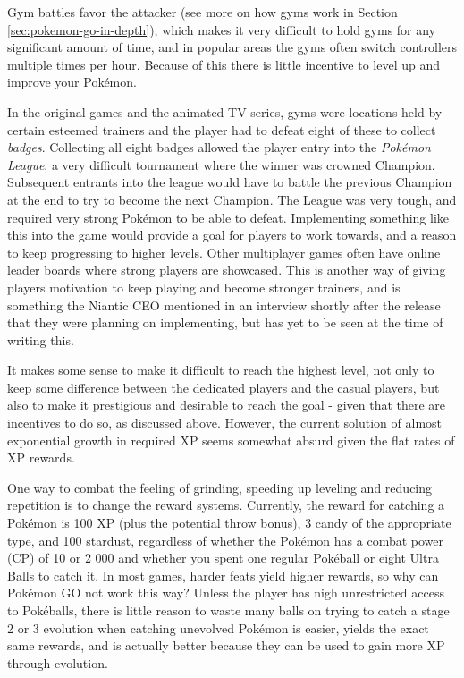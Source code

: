 Gym battles favor the attacker (see more on how gyms work in Section \ref{sec:pokemon-go-in-depth}), which makes it very difficult to hold gyms for any significant amount of time, and in popular areas the gyms often switch controllers multiple times per hour. Because of this there is little incentive to level up and improve your Pokémon.

In the original games and the animated TV series, gyms were locations held by certain esteemed trainers and the player had to defeat eight of these to collect \emph{badges}. Collecting all eight badges allowed the player entry into the \emph{Pokémon League}, a very difficult tournament where the winner was crowned Champion. Subsequent entrants into the league would have to battle the previous Champion at the end to try to become the next Champion. The League was very tough, and required very strong Pokémon to be able to defeat. Implementing something like this into the game would provide a goal for players to work towards, and a reason to keep progressing to higher levels. Other multiplayer games often have online leader boards where strong players are showcased. This is another way of giving players motivation to keep playing and become stronger trainers, and is something the Niantic CEO mentioned in an interview shortly after the release  that they were planning on implementing, but has yet to be seen at the time of writing this.

It makes some sense to make it difficult to reach the highest level, not only to keep some difference between the dedicated players and the casual players, but also to make it prestigious and desirable to reach the goal - given that there are incentives to do so, as discussed above. However, the current solution of almost exponential growth in required XP seems somewhat absurd given the flat rates of XP rewards.

One way to combat the feeling of grinding, speeding up leveling and reducing repetition is to change the reward systems. Currently, the reward for catching a Pokémon is 100 XP (plus the potential throw bonus), 3 candy of the appropriate type, and 100 stardust, regardless of whether the Pokémon has a combat power (CP) of 10 or 2 000 and whether you spent one regular Pokéball or eight Ultra Balls to catch it. In most games, harder feats yield higher rewards, so why can Pokémon GO not work this way? Unless the player has nigh unrestricted access to Pokéballs, there is little reason to waste many balls on trying to catch a stage 2 or 3 evolution when catching unevolved Pokémon is easier, yields the exact same rewards, and is actually better because they can be used to gain more XP through evolution.


